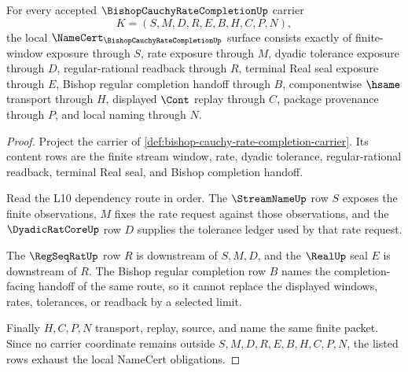 \begin{theorem}
\label{thm:bishop-cauchy-rate-completion-namecert-obligations}
For every accepted $\BishopCauchyRateCompletionUp$ carrier
$$
K=(S,M,D,R,E,B,H,C,P,N),
$$
the local $\NameCert_{\BishopCauchyRateCompletionUp}$ surface consists exactly of finite-window exposure through $S$, rate exposure through $M$, dyadic tolerance exposure through $D$, regular-rational readback through $R$, terminal Real seal exposure through $E$, Bishop regular completion handoff through $B$, componentwise $\hsame$ transport through $H$, displayed $\Cont$ replay through $C$, package provenance through $P$, and local naming through $N$.
\end{theorem}
\begin{proof}
Project the carrier of \autoref{def:bishop-cauchy-rate-completion-carrier}. Its content rows are the finite stream window, rate, dyadic tolerance, regular-rational readback, terminal Real seal, and Bishop completion handoff.

Read the L10 dependency route in order. The $\StreamNameUp$ row $S$ exposes the finite observations, $M$ fixes the rate request against those observations, and the $\DyadicRatCoreUp$ row $D$ supplies the tolerance ledger used by that rate request.

The $\RegSeqRatUp$ row $R$ is downstream of $S,M,D$, and the $\RealUp$ seal $E$ is downstream of $R$. The Bishop regular completion row $B$ names the completion-facing handoff of the same route, so it cannot replace the displayed windows, rates, tolerances, or readback by a selected limit.

Finally $H,C,P,N$ transport, replay, source, and name the same finite packet. Since no carrier coordinate remains outside $S,M,D,R,E,B,H,C,P,N$, the listed rows exhaust the local NameCert obligations.
\end{proof}

